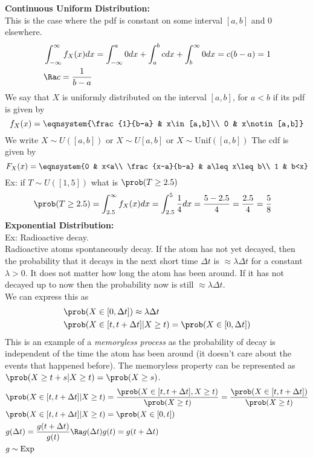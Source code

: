 \textbf{Continuous Uniform Distribution:}\\
This is the case where the pdf is constant on some interval $[a,b]$ and 0 elsewhere.
\begin{align*}
    &\int_{-\infty}^\infty f_X(x)dx=\int_{-\infty}^a 0dx+\int_a^b cdx+\int_b^\infty 0dx=c(b-a)=1\\
    &\Ra c=\frac{1}{b-a}
\end{align*}
We say that $X$ is uniformly distributed on the interval $[a,b]$, for $a<b$ if its pdf is given by
\[f_X(x)=\eqnsystem{\frac{1}{b-a} & x\in[a,b]\\ 0 & x\notin[a,b]}\]
We write $X\sim U([a,b])$ or $X\sim U[a,b]$ or $X\sim\mathrm{Unif}([a,b])$
The cdf is given by
\[F_X(x)=\eqnsystem{0 & x<a\\ \frac{x-a}{b-a} & a\leq x\leq b\\ 1 & b<x}\]
Ex: if $T\sim U([1,5])$ what is $\prob(T\geq 2.5)$
\begin{align*}
    &\prob(T\geq 2.5)=\int_{2.5}^\infty f_X(x)dx=\int_{2.5}^5\frac{1}{4}dx=\frac{5-2.5}{4}=\frac{2.5}{4}=\frac{5}{8}
\end{align*}
\textbf{Exponential Distribution:}\\
Ex: Radioactive decay.\\
Radioactive atoms spontaneously decay. If the atom has not yet decayed, then the probability that it decays in the next short time $\Delta t$ is $\approx \lambda\Delta t$ for a constant $\lambda>0$. It does not matter how long the atom has been around. If it has not decayed up to now then the probability now is still $\approx \lambda \Delta t$.\\
We can express this as
\begin{align*}
    &\prob(X\in[0,\Delta t])\approx\lambda\Delta t\\
    &\prob(X\in[t,t+\Delta t]|X\geq t)=\prob(X\in[0,\Delta t])
\end{align*}
This is an example of a \textit{memoryless process} as the probability of decay is independent of the time the atom has been around (it doesn't care about the events that happened before). The memoryless property can be represented as $\prob(X\geq t+s|X\geq t)=\prob(X\geq s)$.
\begin{align*}
    &\prob(X\in[t,t+\Delta t]|X\geq t)=\frac{\prob(X\in[t,t+\Delta t], X\geq t)}{\prob(X\geq t)}=\frac{\prob(X\in[t,t+\Delta t])}{\prob(X\geq t)}\\
    &\prob(X\in[t,t+\Delta t]|X\geq t)=\prob(X\in[0,t])\\
    &g(\Delta t)=\frac{g(t+\Delta t)}{g(t)}\Ra g(\Delta t)g(t)=g(t+\Delta t)\\
    &g\sim\mathrm{Exp}
\end{align*}
